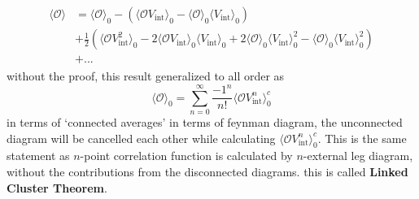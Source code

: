 \documentclass[12pt,halfline,a4paper]{ouparticle}
\begin{document}
\begin{align}
	\begin{split}
\langle\mathcal O \rangle &= \langle \mathcal O \rangle_0 - (\langle\mathcal O V_\text{int}\rangle_0-\langle\mathcal O\rangle_0\langle V_\text{int}\rangle_0)\\
&+\frac{1}{2}(\langle \mathcal O V_\text{int}^2 \rangle_0-2\langle \mathcal O V_\text{int} \rangle_0\langle V_\text{int} \rangle_0+2\langle \mathcal O \rangle_0\langle V_\text{int} \rangle_0^2-\langle \mathcal O \rangle_0\langle V_\text{int} \rangle_0^2)\\
&+...
	\end{split}
\end{align}
without the proof, this result generalized to all order as 
\begin{equation}
	\langle\mathcal O\rangle_0 = \sum^\infty_{n=0}\frac{-1^n}{n!}\langle \mathcal O V_\text{int}^n\rangle_0^c
\end{equation}
in terms of `connected averages'
  in terms of feynman diagram, the unconnected diagram will be cancelled each other while calculating $\langle\mathcal O V_\text{int}^n\rangle_0^c$. This is the same statement as $n$-point correlation function is calculated by $n$-external leg diagram, without the contributions from the disconnected diagrams. this is called \textbf{Linked Cluster Theorem}.
\end{document}
